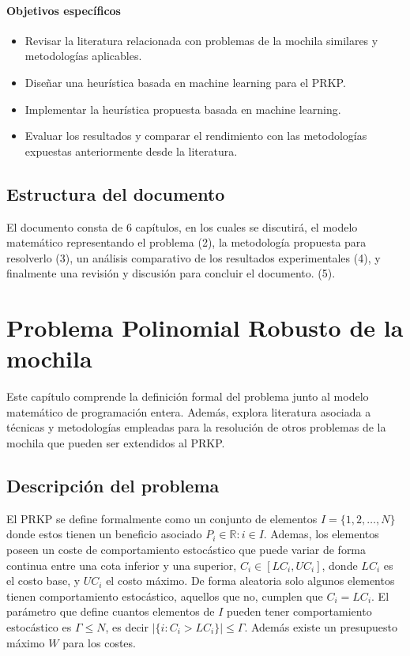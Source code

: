 \documentclass[spanish, a4paper, 12pt, openany,final]{book}
\begin{document}
\subsubsection*{Objetivos específicos}
\begin{itemize}
	\item Revisar la literatura relacionada con problemas de la mochila similares y metodologías aplicables.
	\item Diseñar una heurística basada en machine learning para el PRKP.
	\item Implementar la heurística propuesta basada en machine learning.
	\item Evaluar los resultados y comparar el rendimiento con las metodologías expuestas anteriormente desde la literatura.
\end{itemize}

\section{Estructura del documento}

El documento consta de 6 capítulos, en los cuales se discutirá, el modelo matemático representando el problema (2), la metodología propuesta para resolverlo (3), un análisis comparativo de los resultados experimentales (4), y finalmente una revisión y discusión para concluir el documento. (5).

\clearpage

\chapter{Problema Polinomial Robusto de la mochila}
Este capítulo comprende la definición formal del problema junto al modelo matemático de programación entera. Además, explora literatura asociada a técnicas y metodologías empleadas para la resolución de otros problemas de la mochila que pueden ser extendidos al PRKP.

\section{Descripción del problema}
	El PRKP se define formalmente como un conjunto de elementos $I = \{1,2,\hdots,N\}$ donde estos tienen un beneficio asociado $P_i \in \mathbb{R}:i\in I$. Ademas, los elementos poseen un coste de comportamiento estocástico que puede variar de forma continua entre una cota inferior y una superior, $C_i \in [LC_i,UC_i]$, donde $LC_i$ es el costo base, y $UC_i$ el costo máximo. De forma aleatoria solo algunos elementos tienen comportamiento estocástico, aquellos que no, cumplen que $C_i = LC_i$. El parámetro que define cuantos elementos de $I$ pueden tener comportamiento estocástico es $\Gamma\leq N$, es decir $|\{i: C_i > LC_i\}| \leq \Gamma$. 	Además existe un presupuesto máximo $W$ para los costes.
	
\end{document}
